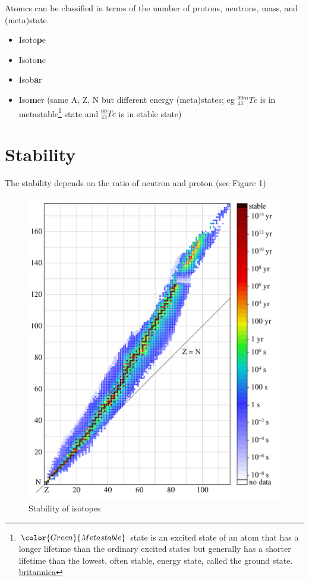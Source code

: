 \documentclass[]{book}
\providecommand{\tightlist}{%
  \setlength{\itemsep}{0pt}\setlength{\parskip}{0pt}}
\let\rmarkdownfootnote\footnote%
\def\footnote{\protect\rmarkdownfootnote}
\theoremstyle{definition}
\theoremstyle{definition}
\theoremstyle{definition}
\theoremstyle{remark}
\begin{document}
Atomcs can be classified in terms of the number of protons, neutrons,
mass, and (meta)state.

\begin{itemize}
\tightlist
\item
  Isoto\textbf{p}e
\item
  Isoto\textbf{n}e
\item
  Isob\textbf{a}r
\item
  Iso\textbf{m}er (same A, Z, N but different energy (meta)states; eg
  \(_{43}^{99m}Tc\) is in metastable\footnote{\(\color{Green}{Metastable}\)
    state is an excited state of an atom that has a longer lifetime than
    the ordinary excited states but generally has a shorter lifetime
    than the lowest, often stable, energy state, called the ground
    state.
    \href{https://www.britannica.com/science/metastable-state}{britannica}}
  state and \(^{99}_{43}Tc\) is in stable state)
\end{itemize}

\section{Stability}\label{stability}

The stability depends on the ratio of neutron and proton (see Figure 1)

\begin{figure}

{\centering \includegraphics[width=0.8\linewidth]{figures/isotope_halflife} 

}

\caption{Stability of isotopes}\label{fig:unnamed-chunk-3}
\end{figure}
\end{document}
